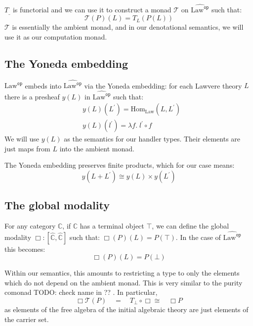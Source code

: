 \documentclass[acmsmall, screen, nonacm]{acmart}
\theoremstyle{definition}
\newcommand{\glob}{\mathop{\Box}}
\newcommand{\cat}{\mathbb{C}}
\newcommand{\psh}{\widehat{\cat}}
\newcommand{\terminal}{\top}
\newcommand{\initial}{\bot}
\newcommand{\lawc}{\mathrm{Law}}
\newcommand{\lawcop}{\lawc^{\mathtt{op}}}
\newcommand{\pshlawcop}{\widehat{\lawcop}}
\newcommand{\yoneda}[1]{y(#1)}
\newcommand{\homset}[3]{\mathrm{Hom}_{#1}(#2, #3)}
\newcommand{\mon}{\mathcal{T}}
\newcommand{\types}{\mathrel{:}}
\newcommand{\todo}[1]{{\color{red}TODO: #1}}
\begin{document}
$T_{\_}$ is functorial and we can use it to construct a monad $\mon$ on
$\pshlawcop$ such that:
\begin{equation*}
\mon(P)(L) = T_L(P(L))
\end{equation*}
$\mon$ is essentially the ambient monad, and in our denotational
semantics, we will use it as our computation monad.

\subsection{The Yoneda embedding}

$\lawcop$ embeds into $\pshlawcop$ via the Yoneda embedding: for each
Lawvere theory $L$ there is a presheaf $\yoneda{L}$ in $\pshlawcop$ such
that:
\begin{align*}
&\yoneda{L}(L^{\prime}) = \homset{\lawc}{L}{L^{\prime}} \\
&\yoneda{L}(l^{\prime}) = \lambda f.\; l^{\prime} \circ f
\end{align*}
We will use $\yoneda{L}$ as the semantics for our handler types. Their
elements are just maps from $L$ into the ambient monad.

The Yoneda embedding preserves finite products, which for our
case means:
\begin{equation*}
\yoneda{L + L^{\prime}} \cong \yoneda{L} \times \yoneda{L^{\prime}}
\end{equation*}

\subsection{The global modality}

For any category $\cat$, if $\cat$ has a terminal object $\terminal$, we
can define the global modality $\glob \types [\psh, \psh]$ such that:
$\glob(P)(L) = P(\terminal)$. In the case of $\pshlawcop$ this becomes:
\begin{equation*}
\glob(P)(L) = P(\initial)
\end{equation*}

Within our semantics, this amounts to restricting a type to only the
elements which do not depend on the ambient monad. This is very similar
to the purity comonad \todo{check name} in ?? \cite{??}. In particular,
\begin{equation*}
  \glob \mon(P) \quad = \quad T_{\initial} \circ \glob
  \cong \quad \glob P
\end{equation*}
as elements of the free algebra of the initial algebraic theory are just
elements of the carrier set.
\end{document}
